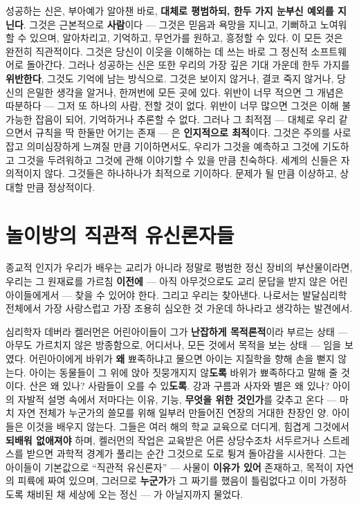 성공하는 신은, 부아예가 알아챈 바로, \textbf{대체로 평범하되, 한두 가지 눈부신 예외를 지닌다}. 그것은 근본적으로 \textbf{사람}이다 — 그것은 믿음과 욕망을 지니고, 기뻐하고 노여워할 수 있으며, 알아차리고, 기억하고, 무언가를 원하고, 흥정할 수 있다. 이 모든 것은 완전히 직관적이다. 그것은 당신이 이웃을 이해하는 데 쓰는 바로 그 정신적 소프트웨어로 돌아간다. 그러나 성공하는 신은 또한 우리의 가장 깊은 기대 가운데 한두 가지를 \textbf{위반한다}, 그것도 기억에 남는 방식으로. 그것은 보이지 않거나, 결코 죽지 않거나, 당신의 은밀한 생각을 알거나, 한꺼번에 모든 곳에 있다. 위반이 너무 적으면 그 개념은 따분하다 — 그저 또 하나의 사람, 전할 것이 없다. 위반이 너무 많으면 그것은 이해 불가능한 잡음이 되어, 기억하거나 추론할 수 없다. 그러나 그 최적점 — 대체로 우리 같으면서 규칙을 딱 한둘만 어기는 존재 — 은 \textbf{인지적으로 최적}이다. 그것은 주의를 사로잡고 의미심장하게 느껴질 만큼 기이하면서도, 우리가 그것을 예측하고 그것에 기도하고 그것을 두려워하고 그것에 관해 이야기할 수 있을 만큼 친숙하다. 세계의 신들은 자의적이지 않다. 그것들은 하나하나가 최적으로 기이하다. 문제가 될 만큼 이상하고, 상대할 만큼 정상적이다.

\section*{놀이방의 직관적 유신론자들}

종교적 인지가 우리가 배우는 교리가 아니라 정말로 평범한 정신 장비의 부산물이라면, 우리는 그 원재료를 가르침 \textbf{이전에} — 아직 아무것으로도 교리 문답을 받지 않은 어린아이들에게서 — 찾을 수 있어야 한다. 그리고 우리는 찾아낸다. 나로서는 발달심리학 전체에서 가장 사랑스럽고 가장 조용히 심오한 것 가운데 하나라고 생각하는 발견에서.

심리학자 데버라 켈러먼은 어린아이들이 그가 \textbf{난잡하게 목적론적}이라 부르는 상태 — 아무도 가르치지 않은 방종함으로, 어디서나, 모든 것에서 목적을 보는 상태 — 임을 보였다. 어린아이에게 바위가 \textbf{왜} 뾰족하냐고 물으면 아이는 지질학을 향해 손을 뻗지 않는다. 아이는 동물들이 그 위에 앉아 짓뭉개지지 않\textbf{도록} 바위가 뾰족하다고 말해 줄 것이다. 산은 왜 있나? 사람들이 오를 수 있\textbf{도록}. 강과 구름과 사자와 별은 왜 있나? 아이의 자발적 설명 속에서 저마다는 이유, 기능, \textbf{무엇을 위한 것인가}를 갖추고 온다 — 마치 자연 전체가 누군가의 쓸모를 위해 일부러 만들어진 연장의 거대한 찬장인 양. 아이들은 이것을 배우지 않는다. 그들은 여러 해의 학교 교육으로 더디게, 힘겹게 그것에서 \textbf{되배워 없애져야} 하며, 켈러먼의 작업은 교육받은 어른 상당수조차 서두르거나 스트레스를 받으면 과학적 경계가 풀리는 순간 그것으로 도로 튕겨 돌아감을 시사한다. 그는 아이들이 기본값으로 ``직관적 유신론자'' — 사물이 \textbf{이유가 있어} 존재하고, 목적이 자연의 피륙에 짜여 있으며, 그러므로 \textbf{누군가}가 그 짜기를 했음이 틀림없다고 이미 가정하도록 채비된 채 세상에 오는 정신 — 가 아닐지까지 물었다.


